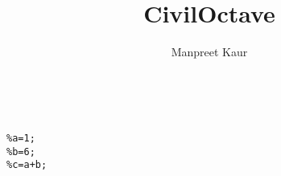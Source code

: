 \documentclass[12pt]{article}
\title{CivilOctave}
\author{Manpreet Kaur}
\begin{document}
\begin{lstlisting}
 

%a=1;
%b=6;
%c=a+b;
\end{lstlisting}
%
\end{document}
